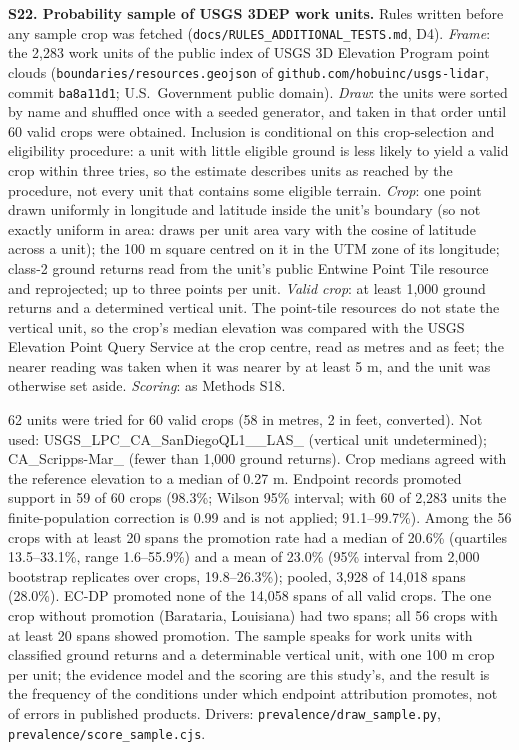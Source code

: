 \documentclass[11pt]{article}
\begin{document}
\vspace{4mm}
\noindent\textbf{S22. Probability sample of USGS 3DEP work units.} Rules written before any sample crop was fetched (\texttt{docs/\allowbreak RULES\_\allowbreak ADDITIONAL\_\allowbreak TESTS.md}, D4). \emph{Frame}: the 2,283 work units of the public index of USGS 3D Elevation Program point clouds (\texttt{boundaries/resources.geojson} of \texttt{github.com/hobuinc/usgs-lidar}, commit \texttt{ba8a11d1}; U.S.\ Government public domain). \emph{Draw}: the units were sorted by name and shuffled once with a seeded generator, and taken in that order until 60 valid crops were obtained. Inclusion is conditional on this crop-selection and eligibility procedure: a unit with little eligible ground is less likely to yield a valid crop within three tries, so the estimate describes units as reached by the procedure, not every unit that contains some eligible terrain. \emph{Crop}: one point drawn uniformly in longitude and latitude inside the unit's boundary (so not exactly uniform in area: draws per unit area vary with the cosine of latitude across a unit); the 100 m square centred on it in the UTM zone of its longitude; class-2 ground returns read from the unit's public Entwine Point Tile resource and reprojected; up to three points per unit. \emph{Valid crop}: at least 1,000 ground returns and a determined vertical unit. The point-tile resources do not state the vertical unit, so the crop's median elevation was compared with the USGS Elevation Point Query Service at the crop centre, read as metres and as feet; the nearer reading was taken when it was nearer by at least 5 m, and the unit was otherwise set aside. \emph{Scoring}: as Methods S18.

62 units were tried for 60 valid crops (58 in metres, 2 in feet, converted). Not used: USGS\_\allowbreak LPC\_\allowbreak CA\_\allowbreak SanDiegoQL1\_\_\allowbreak LAS\_ (vertical unit undetermined); CA\_\allowbreak Scripps-Mar\_ (fewer than 1,000 ground returns). Crop medians agreed with the reference elevation to a median of 0.27 m. Endpoint records promoted support in 59 of 60 crops (98.3\%; Wilson 95\% interval; with 60 of 2{,}283 units the finite-population correction is 0.99 and is not applied; 91.1--99.7\%). Among the 56 crops with at least 20 spans the promotion rate had a median of 20.6\% (quartiles 13.5--33.1\%, range 1.6--55.9\%) and a mean of 23.0\% (95\% interval from 2{,}000 bootstrap replicates over crops, 19.8--26.3\%); pooled, 3,928 of 14,018 spans (28.0\%). EC-DP promoted none of the 14,058 spans of all valid crops. The one crop without promotion (Barataria, Louisiana) had two spans; all 56 crops with at least 20 spans showed promotion. The sample speaks for work units with classified ground returns and a determinable vertical unit, with one 100 m crop per unit; the evidence model and the scoring are this study's, and the result is the frequency of the conditions under which endpoint attribution promotes, not of errors in published products. Drivers: \texttt{prevalence/draw\_sample.py}, \texttt{prevalence/score\_sample.cjs}.
\end{document}
